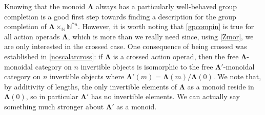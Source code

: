\documentclass{amsbook} %
\newcommand{\ML}{\mathbf{\Lambda}}
\newcommand{\ELnn}{E\Lambda(\underline{2n})}
\numberwithin{section}{chapter}
\begin{document}
%
%
%

Knowing that the monoid $\ML$ always has a particularly well-behaved group completion is a good first step towards finding a description for the group completion of $\ML \times_{\mathbb{N}} \mathbb{N}^{\ast n}$. However, it is worth noting that \cref{gpcompin} is true for all action operads $\ML$, which is more than we really need since, using \cref{Zmor}, we are only interested in the crossed case. One consequence of being crossed was established in \cref{noscalarcross}: if $\ML$ is a crossed action operad, then the free $\ML$-monoidal category on $n$ invertible objects is isomorphic to the free $\ML'$-monoidal category on $n$ invertible objects where $\ML'(m) = \ML(m)/\ML(0)$. We note that, by additivity of lengths, the only invertible elements of $\ML$ as a monoid reside in $\ML(0)$, so in particular $\ML'$ has no invertible elements. We can actually say something much stronger about $\ML'$ as a monoid.

\end{document}
